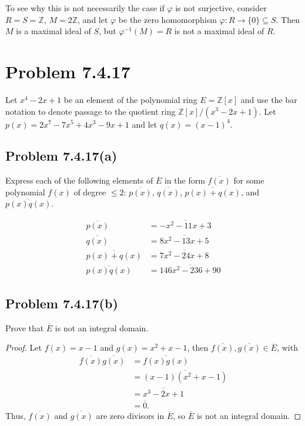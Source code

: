 \documentclass[12pt]{article}
\newenvironment{problem}
    {\begin{lrbox}{\mybox}\begin{minipage}{0.98\textwidth}}
    {\end{minipage}\end{lrbox}\begin{center}\framebox[\textwidth]{\usebox{\mybox}}\end{center}}
\theoremstyle{definition}
\newcommand{\Z}{\mathbb{Z}}
\renewcommand{\phi}{\varphi}
\newcommand{\<}{\left\langle}
\renewcommand{\>}{\right\rangle}
\newcommand{\conj}{\overline}
\begin{document}
To see why this is not necessarily the case if $\phi$ is not surjective, consider $R = S = \Z$, $M = 2\Z$, and let $\phi$ be the zero homomorphism $\phi : R \to \{0\} \subseteq S$. Then $M$ is a maximal ideal of $S$, but $\phi^{-1}(M) = R$ is not a maximal ideal of $R$.

\newpage
\section{Problem 7.4.17}
\begin{problem}
    Let $x^4 - 2x + 1$ be an element of the polynomial ring $E = \Z[x]$ and use the bar notation to denote passage to the quotient ring $\Z[x]/(x^3 - 2x + 1)$. Let $p(x) = 2x^7 - 7x^5 + 4x^3 - 9x + 1$ and let $q(x) = (x - 1)^4$.
\end{problem}


\subsection{Problem 7.4.17(a)}
\begin{problem}
    Express each of the following elements of $\conj{E}$ in the form $\conj{f(x)}$ for some polynomial $f(x)$ of degree $\leq 2$: $\conj{p(x)}$, $\conj{q(x)}$, $\conj{p(x) + q(x)}$, and $\conj{p(x)q(x)}$.
\end{problem}

\begin{align*}
    \conj{p(x)} &= \conj{-x^2 - 11x + 3} \\
    \conj{q(x)} &= \conj{8x^2 - 13x + 5} \\
    \conj{p(x) + q(x)} &= \conj{7x^2 - 24x + 8} \\
    \conj{p(x)q(x)} &= \conj{146x^2 - 236 + 90}
\end{align*}

\subsection{Problem 7.4.17(b)}
\begin{problem}
    Prove that $\conj{E}$ is not an integral domain.
\end{problem}

\begin{proof}
    Let $f(x) = x - 1$ and $g(x) = x^2 + x - 1$, then $\conj{f(x)}, \conj{g(x)} \in \conj{E}$, with
    \begin{align*}
        \conj{f(x)}\conj{g(x)} 
            &= \conj{f(x)g(x)} \\
            &= \conj{(x - 1)(x^2 + x - 1)} \\
            &= \conj{x^3 - 2x + 1} \\
            &= \conj{0}.
    \end{align*}
    Thus, $\conj{f(x)}$ and $\conj{g(x)}$ are zero divisors in $\conj{E}$, so $\conj{E}$ is not an integral domain.
    
\end{proof}
\end{document}
